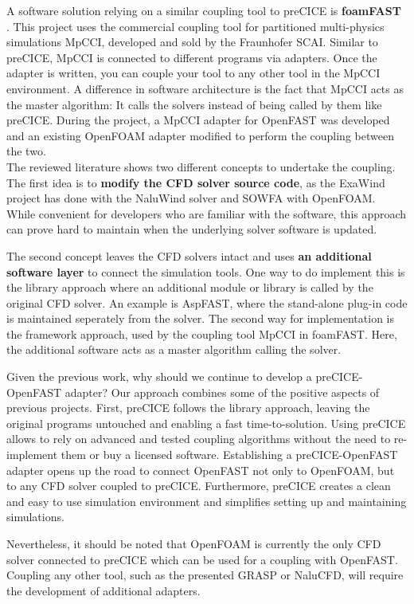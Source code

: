 A software solution relying on a similar coupling tool to preCICE is \textbf{foamFAST} \cite{Weber:2017}. This project uses the commercial coupling tool for partitioned multi-physics simulations MpCCI, developed and sold by the Fraunhofer SCAI. Similar to preCICE, MpCCI is connected to different programs via adapters. Once the adapter is written, you can couple your tool to any other tool in the MpCCI environment. A difference in software architecture is the fact that MpCCI acts as the master algorithm: It calls the solvers instead of being called by them like preCICE. During the project, a MpCCI adapter for OpenFAST was developed and an existing OpenFOAM adapter modified to perform the coupling between the two.\\

The reviewed literature shows two different concepts to undertake the coupling. The first idea is to \textbf{modify the CFD solver source code}, as the ExaWind project has done with the NaluWind solver and SOWFA with OpenFOAM. While convenient for developers who are familiar with the software, this approach can prove hard to maintain when the underlying solver software is updated.

The second concept leaves the CFD solvers intact and uses \textbf{an additional software layer} to connect the simulation tools. One way to do implement this is the library approach where an additional module or library is called by the original CFD solver. An example is AspFAST, where the stand-alone plug-in code is maintained seperately from the solver. The second way for implementation is the framework approach, used by the coupling tool MpCCI in foamFAST. Here, the additional software acts as a master algorithm calling the solver.

Given the previous work, why should we continue to develop a preCICE-OpenFAST adapter?
Our approach combines some of the positive aspects of previous projects. First, preCICE follows the library approach, leaving the original programs untouched and enabling a fast time-to-solution. Using preCICE allows to rely on advanced and tested coupling algorithms without the need to re-implement them or buy a licensed software. Establishing a preCICE-OpenFAST adapter opens up the road to connect OpenFAST not only to OpenFOAM, but to any CFD solver coupled to preCICE. Furthermore, preCICE creates a clean and easy to use simulation environment and simplifies setting up and maintaining simulations.

Nevertheless, it should be noted that OpenFOAM is currently the only CFD solver connected to preCICE which can be used for a coupling with OpenFAST. Coupling any other tool, such as the presented GRASP or NaluCFD, will require the development of additional adapters.

